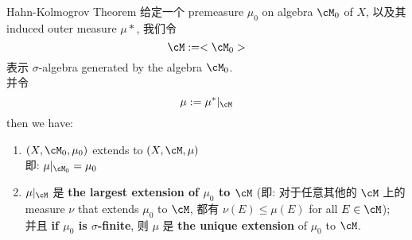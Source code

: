 \documentclass[lang=cn,11pt]{elegantbook}
\begin{document}
\begin{theorem}{Hahn-Kolmogrov Theorem}
\label{Hahn-Kolmogrov Theorem}
给定一个 premeasure $\mu_0$ on algebra $\cM_0$ of $X$, 以及其 induced outer measure $\mu*$, 我们令 
$$
\cM := <\cM_0>
$$
表示 $\sigma$-algebra generated by the algebra $\cM_0$.\\
并令
$$
\mu := \mu^* |_\cM
$$
then we have:
\begin{enumerate}
    \item $(X,\cM_0, \mu_0)$ extends to $(X,\cM,\mu)$\\
    即: $\mu  |_{\cM_0} = \mu_0$
    \item $\mu | _\cM$ 是 \textbf{the largest extension of $\mu_0$ to $\cM$} (即: 对于任意其他的 $\cM$ 上的 measure $\nu$ that extends $\mu_0$ to $\cM$, 都有 $\nu(E) \leq \mu(E)$ for all $E \in \cM$);\\
    并且 \textbf{if $\mu_0$ is $\sigma$-finite}, 则 $\mu$ 是 \textbf{the unique extension} of $\mu_0$ to $\cM$.
\end{enumerate}
\end{theorem}
\end{document}
